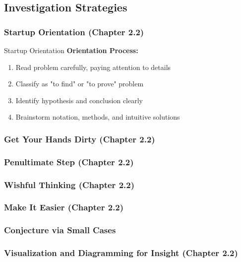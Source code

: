 \documentclass[12pt]{article}
\begin{document}
	\subsection{Investigation Strategies}
	
	\subsubsection{Startup Orientation (Chapter 2.2)}
	
	\begin{strategybox}{Startup Orientation}
		\textbf{Orientation Process:}
		\begin{enumerate}
			\item Read problem carefully, paying attention to details
			\item Classify as "to find" or "to prove" problem
			\item Identify hypothesis and conclusion clearly
			\item Brainstorm notation, methods, and intuitive solutions
		\end{enumerate}
	\end{strategybox}	

	\subsubsection{Get Your Hands Dirty (Chapter 2.2)}

	\subsubsection{Penultimate Step (Chapter 2.2)}

	\subsubsection{Wishful Thinking (Chapter 2.2)}

	\subsubsection{Make It Easier (Chapter 2.2)}

	\subsubsection{Conjecture via Small Cases }

	\subsubsection{Visualization and Diagramming for Insight (Chapter 2.2)}
	
\end{document}

